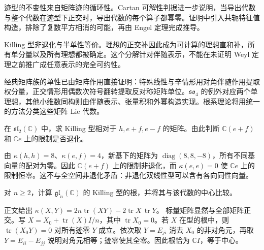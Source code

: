 \begin{chaptersummary}
	迹型的不变性来自矩阵迹的循环性。Cartan 可解性判据进一步说明，当导出代数与整个代数在迹型下正交时，导出代数的每个算子都幂零。证明中引入共轭特征值构造，排除了复数平方相消的可能，再由 Engel 定理完成推导。

	\ProseParagraphBreak

	Killing 型非退化与半单性等价。理想的正交补因此成为可计算的理想直和补，所有单分量以及所有理想都被确定。这个分解针对伴随表示，不能在未证明 Weyl 定理之前推广成任意表示的完全可约性。

	\ProseParagraphBreak

	经典矩阵族的单性已由矩阵作用直接证明：特殊线性与辛情形用对角伴随作用提取权分量，正交情形用偶数次符号翻转提取反对称矩阵单位。\(\mathfrak{so}_4\) 的例外对应两个单理想，其他小维数同构则由伴随表示、张量积和外幂构造实现。根系理论将用统一的方法分类这些矩阵 Lie 代数。
\end{chaptersummary}

\BookExercises

\begin{exercise}\label{b5:ex:13-killing-basis}
	在 \(\mathfrak{sl}_2(\mathbb C)\) 中，求 Killing 型相对于 \(h,e+f,e-f\) 的矩阵。由此判断 \(\mathbb C(e+f)\) 和 \(\mathbb Ce\) 上的限制是否退化。
\end{exercise}
\begin{solution}
	由 \(\kappa(h,h)=8\)、\(\kappa(e,f)=4\)，新基下的矩阵为 \(\operatorname{diag}(8,8,-8)\)，所有不同基向量的配对为零。因此 \(\mathbb C(e+f)\) 上的限制非退化，而 \(\kappa(e,e)=0\) 使 \(\mathbb Ce\) 上的限制恒零。这不与全空间非退化矛盾：非退化双线性型可以含有各向同性向量。
\end{solution}

\begin{exercise}\label{b5:ex:13-gln-killing-radical}
	对 \(n\ge2\)，计算 \(\mathfrak{gl}_n(\mathbb C)\) 的 Killing 型的根，并将其与该代数的中心比较。
\end{exercise}
\begin{solution}
	正文给出 \(\kappa(X,Y)=2n\operatorname{tr}(XY)-2\operatorname{tr}X\,\operatorname{tr}Y\)。 标量矩阵显然与全部矩阵正交。写 \(X=X_0+\operatorname{tr}(X)I/n\)，其中 \(\operatorname{tr}X_0=0\)。若 \(X\) 在型的根中，则 \(\operatorname{tr}(X_0Y)=0\) 对所有迹零 \(Y\) 成立。依次取 \(Y=E_{ji}\) 消去 \(X_0\) 的非对角元，再取 \(Y=E_{ii}-E_{jj}\) 说明对角元相等；迹零使其全零。因此根恰为 \(\mathbb CI\)，等于中心。
\end{solution}

